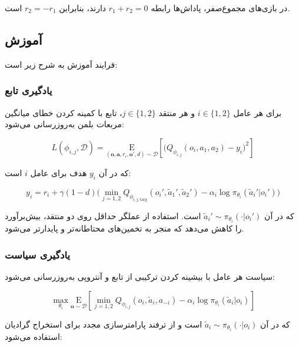 در بازی‌های مجموع­‌صفر، پاداش‌ها رابطه $r_1 + r_2 = 0$ دارند، بنابراین $r_2 = -r_1$ است.

\subsection{آموزش }

فرایند آموزش  به شرح زیر است:

\subsubsection{یادگیری تابع }

برای هر عامل $i \in \{1, 2\}$ و هر منتقد $j \in \{1, 2\}$، تابع  با کمینه کردن خطای میانگین مربعات بلمن به‌روزرسانی می‌شود:

\begin{equation}
    L(\phi_{i,j}, \mathcal{D}) = \underset{(\boldsymbol{o}, \boldsymbol{a}, r_i, \boldsymbol{o}', d) \sim \mathcal{D}}{\mathrm{E}}\left[ 
    \Bigg( Q_{\phi_{i,j}}(o_i, a_1, a_2) - y_i \Bigg)^2
    \right]
\end{equation}

که در آن $y_i$ هدف برای عامل $i$ است:

\begin{equation}
    y_i = r_i + \gamma (1 - d) \Big( \min_{j=1,2} Q_{\phi_{i,j,\text{targ}}}(o_i', \tilde{a}_1', \tilde{a}_2') - \alpha_i \log \pi_{\theta_i}(\tilde{a}_i'|o_i') \Big)
\end{equation}

که در آن $\tilde{a}_i' \sim \pi_{\theta_i}(\cdot|o_i')$ است. استفاده از عملگر حداقل روی دو منتقد، بیش‌برآورد را کاهش می‌دهد که منجر به تخمین‌های محتاطانه‌تر و پایدارتر می‌شود.

\subsubsection{یادگیری سیاست}

سیاست هر عامل با بیشینه کردن ترکیبی از تابع  و آنتروپی به‌روزرسانی می‌شود:

\begin{equation}
    \max_{\theta_i} \underset{\boldsymbol{o} \sim \mathcal{D}}{\mathrm{E}}\left[ \min_{j=1,2}Q_{\phi_{i,j}}(o_i, \tilde{a}_i, a_{-i}) - \alpha_i \log \pi_{\theta_i}(\tilde{a}_i|o_i) \right]
\end{equation}

که در آن $\tilde{a}_i \sim \pi_{\theta_i}(\cdot|o_i)$ است و از ترفند پارامترسازی مجدد برای استخراج گرادیان استفاده می‌شود:

